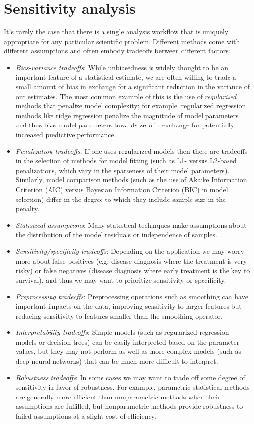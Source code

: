 \section{Sensitivity analysis}

It's rarely the case that there is a single analysis workflow that is uniquely appropriate for any particular scientific problem. Different methods come with different assumptions and often embody tradeoffs between different factors:

\begin{itemize}
\item \textit{Bias-variance tradeoffs}: While unbiasedness is widely thought to be an important feature of a statistical estimate, we are often willing to trade a small amount of bias in exchange for a significant reduction in the variance of our estimates.  The most common example of this is the use of \textit{regularized} methods that penalize model complexity; for example, regularized regression methods like ridge regression penalize the magnitude of model parameters and thus bias model parameters towards zero in exchange for potentially increased predictive performance.
\item \textit{Penalization tradeoffs}: If one uses regularized models then there are tradeoffs in the selection of methods for model fitting (such as L1- versus L2-based penalizations, which vary in the sparseness of their model parameters). Similarly, model comparison methods (such as the use of Akaike Information Criterion (AIC) versus Bayesian Information Criterion (BIC) in model selection) differ in the degree to which they include sample size in the penalty.
\item \textit{Statistical assumptions}: Many statistical techniques make assumptions about the distribution of the model residuals or independence of samples.
\item \textit{Sensitivity/specificity tradeoffs}: Depending on the application we may worry more about false positives (e.g. disease diagnosis where the treatment is very risky) or false negatives (disease diagnosis where early treatment is the key to survival), and thus we may want to prioritize sensitivity or specificity.
\item \textit{Preprocessing tradeoffs}: Preprocessing operations such as smoothing can have important impacts on the data, improving sensitivity to larger features but reducing sensitivity to features smaller than the smoothing operator.
\item \textit{Interpretability tradeoffs}: Simple models (such as regularized regression models or decision trees) can be easily interpreted based on the parameter values, but they may not perform as well as more complex models (such as deep neural networks) that can be much more difficult to interpret.
\item \textit{Robustness tradeoffs}: In some cases we may want to trade off some degree of sensitivity in favor of robustness. For example, parametric statistical methods are generally more efficient than nonparametric methods when their assumptions are fulfilled, but nonparametric methods provide robustness to failed assumptions at a slight cost of efficiency.
\end{itemize}

